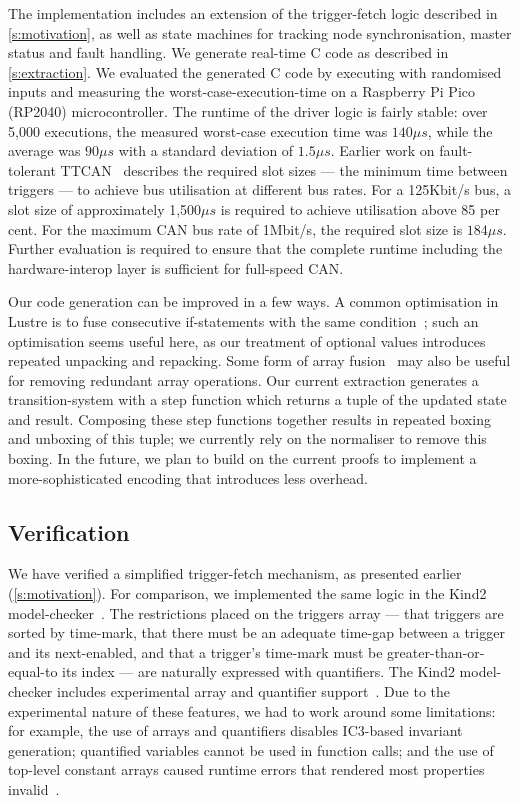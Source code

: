 The implementation includes an extension of the trigger-fetch logic described in \autoref{s:motivation}, as well as state machines for tracking node synchronisation, master status and fault handling.
We generate real-time C code as described in \autoref{s:extraction}.
We evaluated the generated C code by executing with randomised inputs and measuring the worst-case-execution-time on a Raspberry Pi Pico (RP2040) microcontroller.
The runtime of the driver logic is fairly stable: over 5,000 executions, the measured worst-case execution time was $140\mu{}s$, while the average was $90\mu{}s$ with a standard deviation of $1.5\mu{}s$.
Earlier work on fault-tolerant TTCAN~\cite{short2007fault} describes the required slot sizes --- the minimum time between triggers --- to achieve bus utilisation at different bus rates.
For a 125Kbit/s bus, a slot size of approximately 1,500$\mu{}s$ is required to achieve utilisation above 85 per cent.
For the maximum CAN bus rate of 1Mbit/s, the required slot size is $184\mu{}s$.
Further evaluation is required to ensure that the complete runtime including the hardware-interop layer is sufficient for full-speed CAN.

Our code generation can be improved in a few ways.
A common optimisation in Lustre is to fuse consecutive if-statements with the same condition~\cite{bourke2017formally}; such an optimisation seems useful here, as our treatment of optional values introduces repeated unpacking and repacking.
Some form of array fusion~\cite{robinson2017machine} may also be useful for removing redundant array operations.
Our current extraction generates a transition-system with a step function which returns a tuple of the updated state and result.
Composing these step functions together results in repeated boxing and unboxing of this tuple; we currently rely on the \fstar{} normaliser to remove this boxing.
In the future, we plan to build on the current proofs to implement a more-sophisticated encoding that introduces less overhead.

\subsection{Verification}

We have verified a simplified trigger-fetch mechanism, as presented earlier (\autoref{s:motivation}).
For comparison, we implemented the same logic in the Kind2 model-checker~\cite{champion2016kind2}.
The restrictions placed on the triggers array --- that triggers are sorted by time-mark, that there must be an adequate time-gap between a trigger and its next-enabled, and that a trigger's time-mark must be greater-than-or-equal-to its index --- are naturally expressed with quantifiers.
The Kind2 model-checker includes experimental array and quantifier support~\cite{kind2userdoc}.
Due to the experimental nature of these features, we had to work around some limitations: for example, the use of arrays and quantifiers disables IC3-based invariant generation; quantified variables cannot be used in function calls; and the use of top-level constant arrays caused runtime errors that rendered most properties invalid~\cite{kind2024toparray}.

